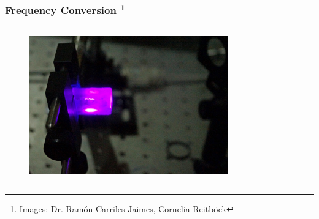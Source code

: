 \documentclass{beamer}
\begin{document}
\begin{frame}
\frametitle{Frequency Conversion%
\footnote{Images: Dr. Ram\'on Carriles Jaimes, Cornelia Reitb\"ock}}
\begin{columns}
\begin{figure}
\centering
\includegraphics[width=\textwidth]{image-ramon}
\end{figure}
\begin{figure}
\centering

\end{figure}
\end{columns}
\end{frame}
\end{document}
